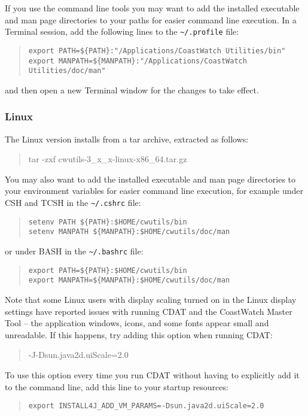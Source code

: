 If you use the command line tools you may want to add the installed
executable and man page directories to your paths for easier command line execution.
In a Terminal session, add the following lines to the {\tt \~{ }/.profile}
file:
\begin{quote}
  {\tt export PATH=\$\{PATH\}:"/Applications/CoastWatch Utilities/bin"} \\
  {\tt export MANPATH=\$\{MANPATH\}:"/Applications/CoastWatch Utilities/doc/man"}
\end{quote}
and then open a new Terminal window for the changes to take effect.

\subsubsection{Linux}

The Linux version installs from a tar archive, extracted as follows:
\begin{quote}
  {\file tar -zxf cwutils-3\_x\_x-linux-x86\_64.tar.gz}
\end{quote}
You may also want to add the installed executable and man page directories to
your environment variables for easier command line
execution, for example under CSH and TCSH in the {\tt \~{ }/.cshrc} file:
\begin{quote}
  {\tt setenv PATH \$\{PATH\}:\$HOME/cwutils/bin} \\
  {\tt setenv MANPATH \$\{MANPATH\}:\$HOME/cwutils/doc/man}
\end{quote}
or under BASH in the {\tt \~{ }/.bashrc} file:
\begin{quote}
  {\tt export PATH=\$\{PATH\}:\$HOME/cwutils/bin} \\
  {\tt export MANPATH=\$\{MANPATH\}:\$HOME/cwutils/doc/man}
\end{quote}
Note that some Linux users with display scaling 
turned on in the Linux display settings have reported issues with 
running CDAT and the CoastWatch Master Tool -- the application windows, icons,
and some fonts appear small and unreadable.  If this happens, try adding this 
option when running CDAT:
\begin{quote}
  -J-Dsun.java2d.uiScale=2.0
\end{quote}
To use this option every time you run CDAT without having to explicitly add 
it to the command line, add this line to your startup resources:
\begin{quote}
  {\tt export INSTALL4J\_ADD\_VM\_PARAMS=-Dsun.java2d.uiScale=2.0}
\end{quote}

